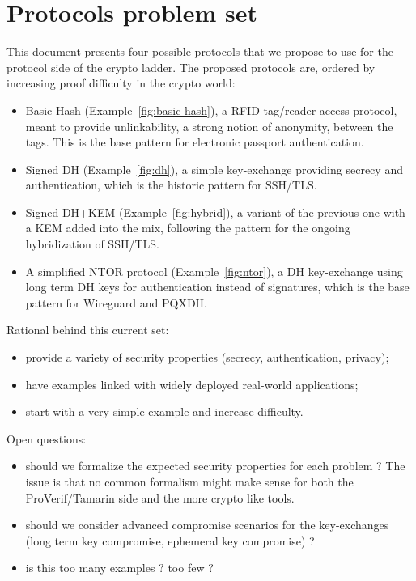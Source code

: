 \documentclass{article}
\begin{document}
\section{Protocols problem set}

This document presents four possible protocols that we propose to use for the protocol side of the crypto ladder. The proposed protocols are, ordered by increasing proof difficulty in the crypto world:
\begin{itemize}
\item Basic-Hash (Example~\ref{fig:basic-hash}), a RFID tag/reader access protocol, meant to provide unlinkability, a strong notion of anonymity, between the tags. This is the base pattern for electronic passport authentication.
\item Signed DH (Example~\ref{fig:dh}), a simple key-exchange providing secrecy and authentication,  which is the historic pattern for SSH/TLS.
\item  Signed DH+KEM (Example~\ref{fig:hybrid}), a variant of the previous one with a KEM added into the mix,  following the pattern for the ongoing hybridization of SSH/TLS.
\item A simplified NTOR protocol (Example~\ref{fig:ntor}), a DH key-exchange using long term DH keys for authentication instead of signatures, which is the base pattern for Wireguard and PQXDH.
\end{itemize}

Rational behind this current set:
\begin{itemize}
\item provide a variety of security properties (secrecy, authentication, privacy);
\item have examples linked with widely deployed real-world applications;
\item start with a very simple example and increase difficulty.  
\end{itemize}

Open questions:
\begin{itemize}
\item should we formalize the expected security properties for each problem ? The issue is that no common formalism might make sense for both the ProVerif/Tamarin side and the more crypto like tools.
\item should we consider advanced compromise scenarios for the key-exchanges (long term key compromise, ephemeral key compromise) ?
\item is this too many examples ? too few ?  
  
\end{itemize}
\end{document}
